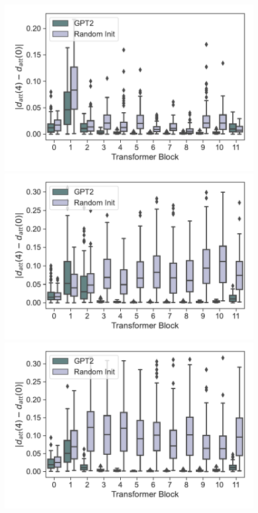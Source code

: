\begin{figure}[ht]
    \centering
    \begin{minipage}[b]{0.32\linewidth}
        \includegraphics[width=\linewidth]{figs/att_dist_diff_0_4_gpt2_dt_hopper_medium_666_K1.pdf}
    \end{minipage}
    \begin{minipage}[b]{0.32\linewidth}
        \includegraphics[width=\linewidth]{figs/att_dist_diff_0_4_gpt2_dt_halfcheetah_medium_666_K1.pdf}
    \end{minipage}
    \begin{minipage}[b]{0.32\linewidth}
        \includegraphics[width=\linewidth]{figs/att_dist_diff_0_4_gpt2_dt_walker2d_medium_666_K1.pdf}

\end{minipage}
\end{figure}
